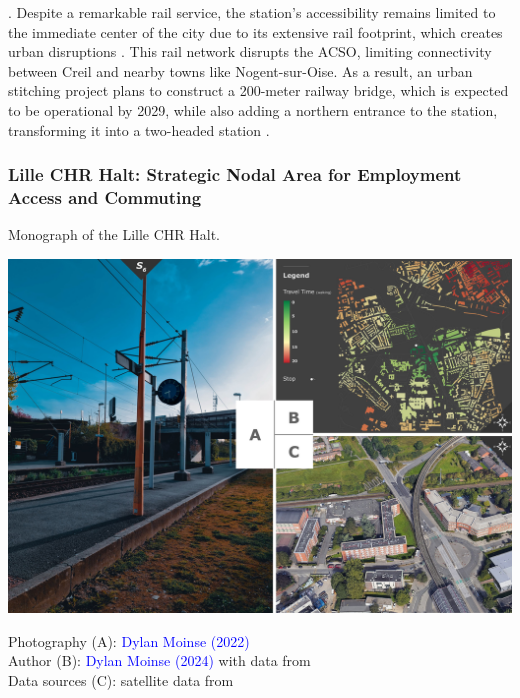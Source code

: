 \begin{refsegment}
{}. Despite a remarkable rail service, the station’s accessibility remains limited to the immediate center of the city due to its extensive rail footprint, which creates urban disruptions \textcolor{blue}{\autocite[19]{block_novel_2024}}. This rail network disrupts the \acrshort{ACSO}, limiting connectivity between Creil and nearby towns like Nogent-sur-Oise. As a result, an urban stitching project plans to construct a 200-meter railway bridge, which is expected to be operational by 2029, while also adding a northern entrance to the station, transforming it into a two-headed station \textcolor{blue}{\autocite[6]{conseil_regional_de_picardie_gare_2010}}.%

\subsubsection*{Lille CHR Halt: Strategic Nodal Area for Employment Access and Commuting
    \label{chap3:application-observation-quantitative-lille-chr}
    }

    \begin{carte}[h!]\vspace*{4pt}
        \caption{Monograph of the Lille CHR Halt.}
        \label{fig-chap3:monographie-lille-chr}
        \centerline{\includegraphics[height=.35\pageheight]{src/Figures/Chap-3/EN_Gare_Lille_CHR.jpg}}
        \vspace{5pt}
        \begin{flushright}\scriptsize{
        Photography (A): \textcolor{blue}{Dylan Moinse (2022)}
        \\
        Author (B): \textcolor{blue}{Dylan Moinse (2024)} with data from \textcolor{blue}{\textcite{openstreetmap_openstreetmap_2023}}
        \\
        Data sources (C): satellite data from \textcolor{blue}{\textcite{google_earth_google_2023}}
        }\end{flushright}
    \end{carte}


\end{refsegment}
